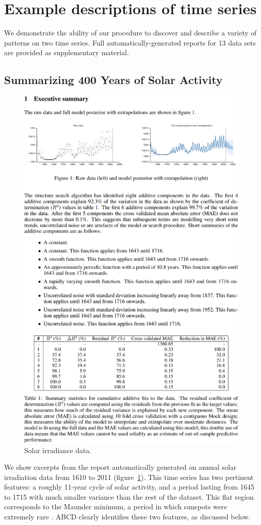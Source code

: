 \documentclass[letterpaper]{article}
\newcommand{\procedurename}{ABCD}
\renewcommand{\fTBD}[1]{}
\begin{document}

\fTBD{JL: We should also mention that the detailed descriptions are less modular - but not necessarily so}
\fTBD{JL: Talk about different templates based on parameters}

\section{Example descriptions of time series}
\label{sec:examples}
We demonstrate the ability of our procedure to discover and describe a variety of patterns on two time series.
Full automatically-generated reports for 13 data sets are provided as supplementary material.

\subsection{Summarizing 400 Years of Solar Activity}
\label{sec:solar}

\begin{figure}[h]
\centering
\includegraphics[trim=0.2cm 18.0cm 8cm 2cm, clip, width=0.98\columnwidth, height=0.45\columnwidth]{solarpages/pg_0002-crop}
\caption{
Solar irradiance data.}
\label{fig:solar}
\end{figure}

We show excerpts from the report automatically generated on annual solar irradiation data from 1610 to 2011 (figure~\ref{fig:solar}).
This time series has two pertinent features: a roughly 11-year cycle of solar activity, and a period lasting from 1645 to 1715 with much smaller variance than the rest of the dataset.
This flat region corresponds to the Maunder minimum, a period in which sunspots were extremely rare \citep{lean1995reconstruction}.
\procedurename{} clearly identifies these two features, as discussed below.
\end{document}
